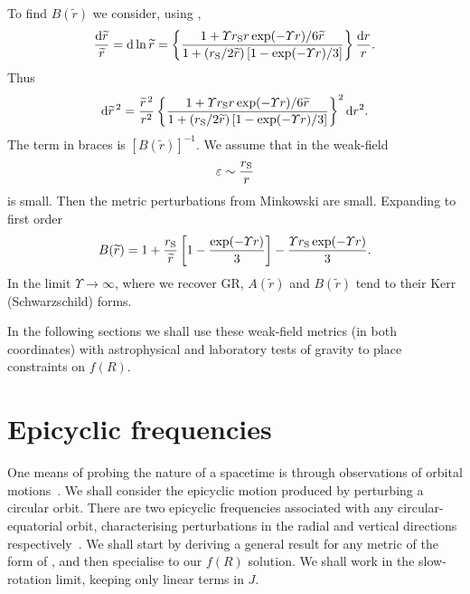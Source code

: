 To find $B(\widetilde{r})$ we consider, using ,
\begin{equation}
\frac{\mathrm{d} \widetilde{r}}{\widetilde{r}} =  \mathrm{d} \ln \widetilde{r} = \left\{\frac{1 + {\Upsilon r_\mathrm{S}r\exp(-\Upsilon r)}/{6\widetilde{r}}}{1 + ({r_\mathrm{S}}/{2\widetilde{r}})\left[1 - {\exp(-\Upsilon r)}/{3}\right]}\right\}\frac{\mathrm{d} r}{r}.
\end{equation}
Thus
\begin{equation}
\mathrm{d} \widetilde{r}^{\,2} = \frac{\widetilde{r}^{\,2}}{r^2}\left\{\frac{1 + {\Upsilon r_\mathrm{S}r\exp(-\Upsilon r)}/{6\widetilde{r}}}{1 + ({r_\mathrm{S}}/{2\widetilde{r}})\left[1 - {\exp(-\Upsilon r)}/{3}\right]}\right\}^2 \mathrm{d} r^2.
\end{equation}
The term in braces is $\left[B(\widetilde{r})\right]^{-1}$. We assume that in the weak-field
\begin{equation}
\varepsilon \sim \frac{r_\mathrm{S}}{r}
\end{equation}
is small. Then the metric perturbations from Minkowski are small. Expanding to first order~\cite{Olmo2007c}
\begin{equation}
B(\widetilde{r})  = 1 + \frac{r_\mathrm{S}}{\widetilde{r}}\left[1 - \frac{\exp(-\Upsilon r )}{3}\right] - \frac{\Upsilon r_\mathrm{S} \exp(-\Upsilon r)}{3}.
\label{eq:B_metric}
\end{equation}
In the limit $\Upsilon \rightarrow \infty$, where we recover GR, $A(\widetilde{r})$ and $B(\widetilde{r})$ tend to their Kerr (Schwarzschild) forms.

In the following sections we shall use these weak-field metrics (in both coordinates) with astrophysical and laboratory tests of gravity to place constraints on $f(R)$.

\section{Epicyclic frequencies\label{sec:Epicycle}}

One means of probing the nature of a spacetime is through observations of orbital motions~\cite{Gair2008a}. We shall consider the epicyclic motion produced by perturbing a circular orbit. There are two epicyclic frequencies associated with any circular-equatorial orbit, characterising perturbations in the radial and vertical directions respectively~\cite{Binney1987}. We shall start by deriving a general result for any metric of the form of , and then specialise to our $f(R)$ solution. We shall work in the slow-rotation limit, keeping only linear terms in $J$.

